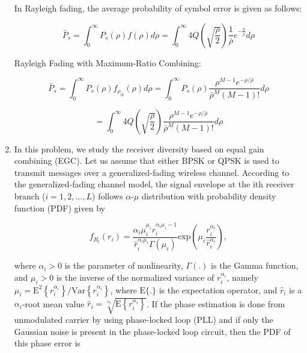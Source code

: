 \documentclass[fleqn]{article}
\makeatletter
\newenvironment{equationCenter}{\@fleqnfalse\begin{equation*}}{\end{equation*}}
\makeatother
\begin{document}
\begin{enumerate}
		In Rayleigh fading, the average probability of symbol error is given as follows:
		
		\begin{equation*}
			\bar{P}_s = \int_{0}^{\infty}{P_s(\rho)f(\rho)d\rho} = \int_{0}^{\infty}{4Q\left(\sqrt{\frac{\rho}{2}}\right)\frac{1}{\bar{\rho}}e^{-\frac{\rho}{\bar{\rho}}}d\rho}
		\end{equation*}
		
		Rayleigh Fading with Maximum-Ratio Combining:
		
		\begin{equation*}
			\bar{P}_s = \int_{0}^{\infty}{P_s(\rho)f_{\rho_{\oplus}}(\rho)d\rho} = \int_{0}^{\infty}{P_s(\rho)\frac{\rho^{M-1}e^{-\rho/\bar{\rho}}}{\bar{\rho}^M(M-1)!}d\rho}
		\end{equation*}
		
		\begin{equation*}
			= \int_{0}^{\infty}{4Q\left(\sqrt{\frac{\rho}{2}}\right)\frac{\rho^{M-1}e^{-\rho/\bar{\rho}}}{\bar{\rho}^M(M-1)!}d\rho}
		\end{equation*}
		
		\item In this problem, we study the receiver diversity based on equal gain combining (EGC). Let us assume that either BPSK or QPSK is used to transmit messages over a generalized-fading wireless channel. According to
the generalized-fading channel model, the signal envelope at the ith receiver branch ($i=1,2,\ldots,L$) follows $\alpha$-$\mu$ distribution with probability density function (PDF) given by

		\begin{equationCenter}
			f_{R_i}(r_i) = \frac{\alpha_i\mu_i^{\mu_i}r_i^{\alpha_i\mu_i-1}}{\hat{r}_i^{\alpha_i\mu_i}\Gamma(\mu_i)}\text{exp}\left(\mu_i\frac{r_i^{\alpha_i}}{\hat{r}_i^{\alpha_i}}\right),
		\end{equationCenter}
		
		where $\alpha_i > 0$ is the parameter of nonlinearity, $\Gamma(.)$ is the Gamma function, and $\mu_i > 0$ is the inverse of the normalized variance of $r_i^{\alpha_i}$, namely $\mu_i = \text{E}^2\left\{r_i^{\alpha_i}\right\}/\text{Var}\left\{r_i^{\alpha_i}\right\}$, where $\text{E}\{.\}$ is the expectation operator, and $\hat{r}_i$ is a $\alpha_i$-root mean value $\hat{r}_i=\sqrt[\alpha_i]{\text{E}\left\{r_i^{\alpha_i}\right\}}$. If the phase estimation is done from unmodulated carrier by using phase-locked loop (PLL) and if only the Gaussian noise is present in the phase-locked loop circuit, then the PDF of this phase error is


\end{enumerate}
\end{document}
